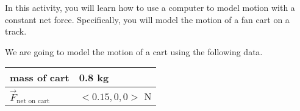 

\apparatus


\longgoal

In this activity, you will learn how to use a computer to model motion with a constant net force. Specifically, you will model the motion of a fan cart on a track.

\introduction

We are going to model the motion of a cart using the following data.

\bigskip
\noindent
\begin{tabular}{|p{1in}|p{2in}|}
	\hline
	mass of cart & 0.8 kg\\
	\hline
	$\vec{F}_{\mbox{net on cart}}$ & $<0.15,0,0>$ N\\
	\hline
\end{tabular}

\procedure

